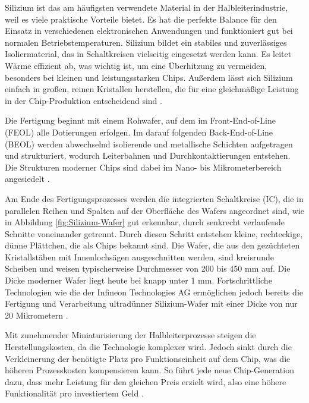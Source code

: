 Silizium ist das am häufigsten verwendete Material in der Halbleiterindustrie, weil es viele praktische Vorteile bietet. Es hat die perfekte Balance für den Einsatz in verschiedenen elektronischen Anwendungen und funktioniert gut bei normalen Betriebstemperaturen. Silizium bildet ein stabiles und zuverlässiges Isoliermaterial, das in Schaltkreisen vielseitig eingesetzt werden kann. Es leitet Wärme effizient ab, was wichtig ist, um eine Überhitzung zu vermeiden, besonders bei kleinen und leistungsstarken Chips. Außerdem lässt sich Silizium einfach in großen, reinen Kristallen herstellen, die für eine gleichmäßige Leistung in der Chip-Produktion entscheidend sind \cite{lienig2023halbleitertechnologie}.

Die Fertigung beginnt mit einem Rohwafer, auf dem im Front-End-of-Line (FEOL) alle Dotierungen erfolgen. Im darauf folgenden Back-End-of-Line (BEOL) werden abwechselnd isolierende und metallische Schichten aufgetragen und strukturiert, wodurch Leiterbahnen und Durchkontaktierungen entstehen. Die Strukturen moderner Chips sind dabei im Nano- bis Mikrometerbereich angesiedelt \cite{lienig2023halbleitertechnologie}.

Am Ende des Fertigungsprozesses werden die integrierten Schaltkreise (\gls{IC}), die in parallelen Reihen und Spalten auf der Oberfläche des Wafers angeordnet sind, wie in Abbildung \ref{fig:Silizium-Wafer} gut erkennbar, durch senkrecht verlaufende Schnitte voneinander getrennt. Durch diesen Schritt entstehen kleine, rechteckige, dünne Plättchen, die als Chips bekannt sind. Die Wafer, die aus den gezüchteten Kristallstäben mit Innenlochsägen ausgeschnitten werden, sind kreisrunde Scheiben und weisen typischerweise Durchmesser von 200 bis 450 mm auf. Die Dicke moderner Wafer liegt heute bei knapp unter 1 mm. Fortschrittliche Technologien wie die der Infineon Technologies AG ermöglichen jedoch bereits die Fertigung und Verarbeitung ultradünner Silizium-Wafer mit einer Dicke von nur 20 Mikrometern \cite{infineon2024dünnsterWafer}.

Mit zunehmender Miniaturisierung der Halbleiterprozesse steigen die Herstellungskosten, da die Technologie komplexer wird. Jedoch sinkt durch die Verkleinerung der benötigte Platz pro Funktionseinheit auf dem Chip, was die höheren Prozesskosten kompensieren kann. So führt jede neue Chip-Generation dazu, dass mehr Leistung für den gleichen Preis erzielt wird, also eine höhere Funktionalität pro investiertem Geld \cite{lienig2023halbleitertechnologie}.